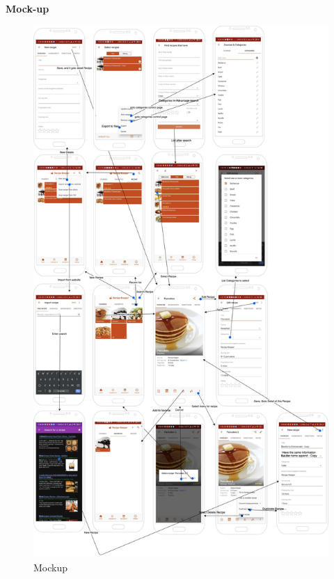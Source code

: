 \documentclass{article}
\begin{document}
\textbf{ Mock-up}

\begin{figure}[h!]
\centerin
\includegraphics[scale=0.11]{Images/Mockup.jpg}
\caption{Mockup}
\label{fig:Mockup}
\end{figure}
\end{document}
